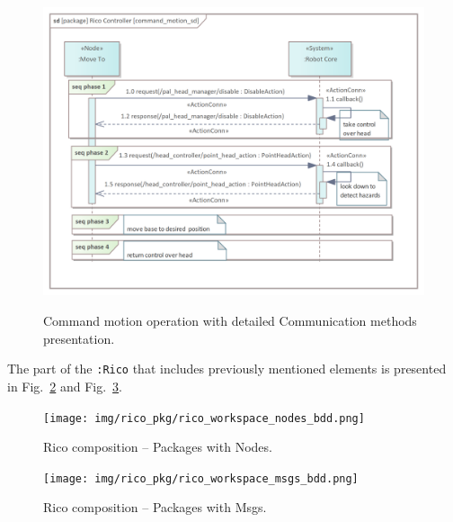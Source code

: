 \documentclass[11pt,oneside,a4paper]{report}
\begin{document}
	\begin{figure}[H]
		\centering
		\begin{center}
			{\includegraphics[scale=1.0]{img/rico_pkg/command_motion_sd.png}}
		\end{center}
		\caption{Command motion operation with detailed Communication methods presentation.} 
		\label{fig:command_motion_sd}
	\end{figure}
	
	The part of the \stWorkspace{} \texttt{:Rico} that includes previously mentioned elements is presented in Fig.~\ref{fig:rico_workspace_nodes_bdd} and Fig.~\ref{fig:rico_workspace_msgs_bdd}.
	
	\begin{figure}[H]
		\centering
		\begin{center}
			{\texttt{[image: img/rico\_pkg/rico\_workspace\_nodes\_bdd.png]}}
		\end{center}
		\caption{Rico \stWorkspace{} composition -- Packages with Nodes.}
		\label{fig:rico_workspace_nodes_bdd}
	\end{figure}

	\begin{figure}[H]
		\centering
		\begin{center}
			{\texttt{[image: img/rico\_pkg/rico\_workspace\_msgs\_bdd.png]}}
		\end{center}
		\caption{Rico \stWorkspace{} composition -- Packages with Msgs.}
		\label{fig:rico_workspace_msgs_bdd}
	\end{figure}
	
			
\AtNextBibliography{\small}
\printbibliography
	
\end{document}
